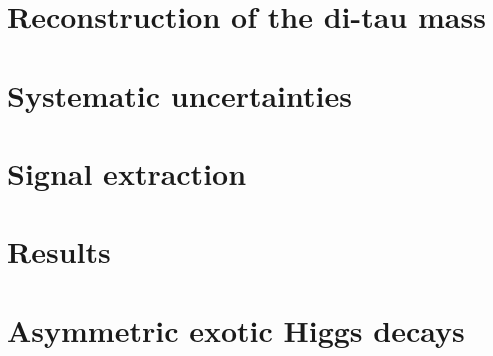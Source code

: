 \documentclass[12pt,lot,lof]{puthesis}
\begin{document}
\chapter{Reconstruction of the di-tau mass}
\label{chapter:ch-11:reconstruction-of-di-tau-mass}


\chapter{Systematic uncertainties}
\label{chapter:ch-12:systematic-uncertainties}


\chapter{Signal extraction}
\label{chapter:ch-13:signal-extraction}


\chapter{Results}


\chapter{Asymmetric exotic Higgs decays}

% 

 \label{bib}
\end{document}
